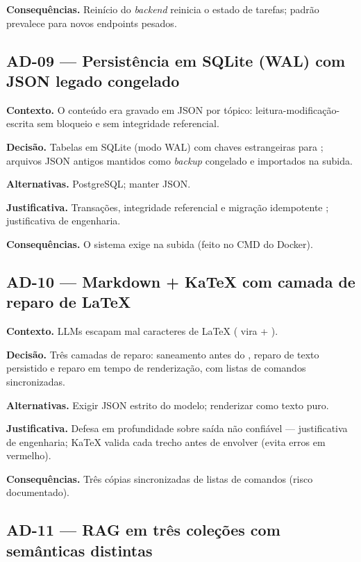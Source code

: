 \textbf{Consequências.} Reinício do \emph{backend} reinicia o estado de tarefas; padrão prevalece para novos endpoints pesados.

\subsection{AD-09 --- Persistência em SQLite (WAL) com JSON legado congelado}

\textbf{Contexto.} O conteúdo era gravado em JSON por tópico: leitura-modificação-escrita sem bloqueio e sem integridade referencial.

\textbf{Decisão.} Tabelas em SQLite (modo WAL) com chaves estrangeiras para \texttt{}; arquivos JSON antigos mantidos como \emph{backup} congelado e importados na subida.

\textbf{Alternativas.} PostgreSQL; manter JSON.

\textbf{Justificativa.} Transações, integridade referencial e migração idempotente \cite{sqlite_2024}; justificativa de engenharia.

\textbf{Consequências.} O sistema exige \texttt{} na subida (feito no CMD do Docker).

\subsection{AD-10 --- Markdown + KaTeX com camada de reparo de LaTeX}

\textbf{Contexto.} LLMs escapam mal caracteres de LaTeX (\texttt{} vira \texttt{} + \texttt{}).

\textbf{Decisão.} Três camadas de reparo: saneamento antes do \texttt{}, reparo de texto persistido e reparo em tempo de renderização, com listas de comandos sincronizadas.

\textbf{Alternativas.} Exigir JSON estrito do modelo; renderizar como texto puro.

\textbf{Justificativa.} Defesa em profundidade sobre saída não confiável --- justificativa de engenharia; KaTeX valida cada trecho antes de envolver (evita erros em vermelho).

\textbf{Consequências.} Três cópias sincronizadas de listas de comandos (risco documentado).

\subsection{AD-11 --- RAG em três coleções com semânticas distintas}

